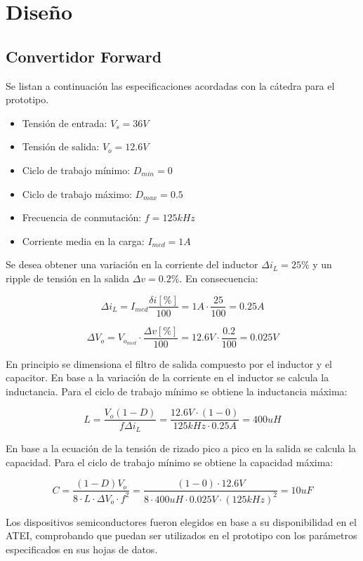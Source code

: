 \section{Diseño}

\subsection{Convertidor Forward}

Se listan a continuación las especificaciones acordadas con la cátedra para el prototipo.

\begin{itemize}
    \item Tensión de entrada: $V_s=36V$
    \item Tensión de salida: $V_o=12.6V$
    \item Ciclo de trabajo mínimo: $D_{min}=0$
    \item Ciclo de trabajo máximo: $D_{max}=0.5$
    \item Frecuencia de conmutación: $f=125kHz$
    \item Corriente media en la carga: $I_{med}=1A$
\end{itemize}

Se desea obtener una variación en la corriente del inductor $\Delta i_L=25\%$ y un ripple de tensión en la salida $\Delta v=0.2\%$.
En consecuencia:

$$ \Delta i_L=I_{med}\frac{\delta i[\%]}{100}=1A\cdot\frac{25}{100}=0.25A $$

$$ \Delta V_o=V_{o_{med}}\cdot\frac{\Delta v[\%]}{100}=12.6V\cdot\frac{0.2}{100}=0.025V $$

En principio se dimensiona el filtro de salida compuesto por el inductor y el capacitor. 
En base a la variación de la corriente en el inductor se calcula la inductancia.
Para el ciclo de trabajo mínimo se obtiene la inductancia máxima:

$$ L=\frac{V_o(1-D)}{f\Delta i_L}=\frac{12.6V\cdot(1-0)}{125kHz\cdot0.25A}=400uH $$

En base a la ecuación de la tensión de rizado pico a pico en la salida se calcula la capacidad.
Para el ciclo de trabajo mínimo se obtiene la capacidad máxima:

$$ C=\frac{(1-D)V_o}{8\cdot L\cdot\Delta V_o\cdot f^2}=\frac{(1-0)\cdot12.6V}{8\cdot400uH\cdot0.025V\cdot(125kHz)^2}=10uF $$

Los dispositivos semiconductores fueron elegidos en base a su disponibilidad en el ATEI,
comprobando que puedan ser utilizados en el prototipo con los parámetros especificados en sus hojas de datos.  

